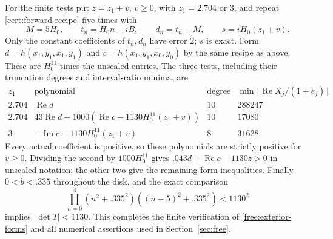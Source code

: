 For the finite tests put $z=z_1+v$, $v\ge0$, with $z_1=2.704$ or
$3$, and repeat \eqref{cert:forward-recipe} five times with
\[
 M=5H_0,\qquad t_n=H_0n-iB,\qquad d_n=t_n-M,
 \qquad s=iH_0(z_1+v).
\]
Only the constant coefficients of $t_n,d_n$ have error $2$; $s$ is
exact.  Form $d=h(x_1,y_1,x_1,y_1)$ and
$c=h(x_1,y_1,x_0,y_0)$ by the same recipe as above.  These are
$H_0^{11}$ times the unscaled entries.  The three tests, including
their truncation degrees and interval-ratio minima, are
\begin{equation}\label{cert:exterior-table}
\begin{array}{c|l|c|r}
 z_1&\text{polynomial}&\text{degree}&
 \min\lfloor\operatorname{Re}X_j/(1+e_j)\rfloor\\\hline
 2.704&\operatorname{Re}d&10&288247\\
 2.704&43\operatorname{Re}d+
 1000(\operatorname{Re}c-1130H_0^{11}(z_1+v))&10&17080\\
 3&-\operatorname{Im}c-1130H_0^{11}(z_1+v)&8&31628
\end{array}
\end{equation}
Every actual coefficient is positive, so these polynomials are
strictly positive for $v\ge0$.  Dividing the second by
$1000H_0^{11}$ gives $.043d+\operatorname{Re}c-1130z>0$ in
unscaled notation; the other two give the remaining form inequalities.
Finally $0<b<.335$ throughout the disk, and the exact comparison
\begin{equation}\label{cert:exterior-determinant}
 \prod_{n=0}^4(n^2+.335^2)((n-5)^2+.335^2)<1130^2
\end{equation}
implies $|\det T|<1130$.  This completes the finite verification of
\eqref{free:exterior-forms} and all numerical assertions used in
Section~\ref{sec:free}.
